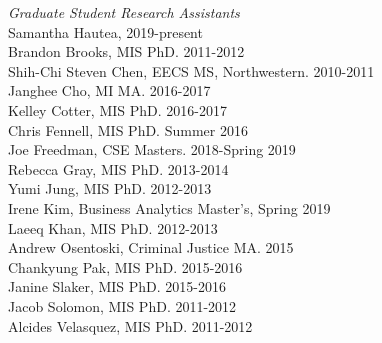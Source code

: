 \documentclass[9pt]{extarticle}
\begin{document}
\emph{Graduate Student Research Assistants} \\[1pt]
Samantha Hautea, 2019-present \\
Brandon Brooks, MIS PhD. 2011-2012 \\
Shih-Chi Steven Chen, EECS MS, Northwestern. 2010-2011 \\
Janghee Cho, MI MA. 2016-2017 \\
Kelley Cotter, MIS PhD. 2016-2017 \\
Chris Fennell, MIS PhD. Summer 2016 \\
Joe Freedman, CSE Masters. 2018-Spring 2019 \\
Rebecca Gray, MIS PhD. 2013-2014 \\
Yumi Jung, MIS PhD. 2012-2013 \\
Irene Kim, Business Analytics Master's, Spring 2019 \\
Laeeq Khan, MIS PhD. 2012-2013 \\
Andrew Osentoski, Criminal Justice MA. 2015 \\
Chankyung Pak, MIS PhD. 2015-2016 \\
Janine Slaker, MIS PhD. 2015-2016 \\
Jacob Solomon, MIS PhD. 2011-2012 \\
Alcides Velasquez, MIS PhD. 2011-2012
\end{document}
